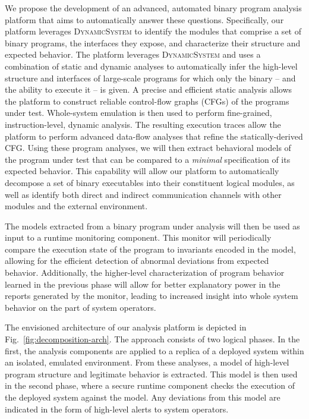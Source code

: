 \documentclass[letterpaper,twoside,11pt,headings=small]{scrartcl}
\newcommand{\dynamicsys}{\textsc{DynamicSystem}\xspace}
\begin{document}
We propose the development of an advanced, automated binary program analysis
platform that aims to automatically answer these questions.  Specifically, our
platform leverages \dynamicsys to identify the modules that comprise a set of
binary programs, the interfaces they expose, and characterize their structure
and expected behavior.  The platform leverages \dynamicsys and uses a
combination of static and dynamic analyses to automatically infer the
high-level structure and interfaces of large-scale programs for which only the
binary -- and the ability to execute it -- is given.  A precise and efficient
static analysis allows the platform to construct reliable control-flow graphs
(CFGs) of the programs under test.  Whole-system emulation is then used to
perform fine-grained, instruction-level, dynamic analysis.  The resulting
execution traces allow the platform to perform advanced data-flow analyses
that refine the statically-derived CFG.  Using these program analyses, we will
then extract behavioral models of the program under test that can be compared
to a \emph{minimal} specification of its expected behavior.  This capability
will allow our platform to automatically decompose a set of binary executables
into their constituent logical modules, as well as identify both direct and
indirect communication channels with other modules and the external
environment.

The models extracted from a binary program under analysis will then be used as
input to a runtime monitoring component.  This monitor will periodically
compare the execution state of the program to invariants encoded in the model,
allowing for the efficient detection of abnormal deviations from expected
behavior.  Additionally, the higher-level characterization of program behavior
learned in the previous phase will allow for better explanatory power in the
reports generated by the monitor, leading to increased insight into whole
system behavior on the part of system operators.

The envisioned architecture of our analysis platform is depicted in
Fig.~\ref{fig:decomposition-arch}.  The approach consists of two logical
phases.  In the first, the analysis components are applied to a replica of a
deployed system within an isolated, emulated environment.  From these
analyses, a model of high-level program structure and legitimate behavior is
extracted.  This model is then used in the second phase, where a secure
runtime component checks the execution of the deployed system against the
model.  Any deviations from this model are indicated in the form of high-level
alerts to system operators.
\end{document}
